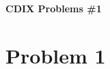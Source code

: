 \documentclass[a4paper, 10pt]{article}
\begin{document}
    \begin{center}
        \fontsize{20.74pt}{10pt}%
        \textbf{CDIX Problems \#1}
    \end{center}

    \section{\sffamily Problem 1}
    

    
\end{document}

